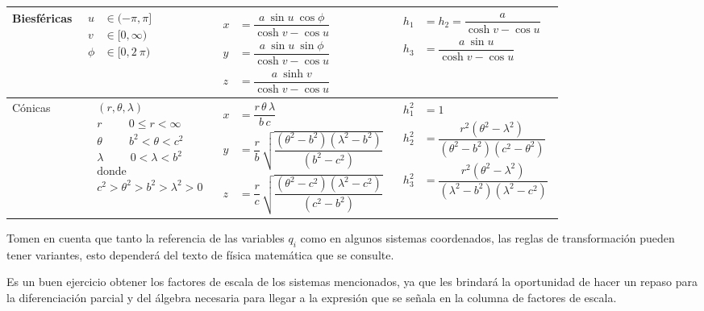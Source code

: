 \documentclass[12pt,landscape]{article}
\numberwithin{equation}{section}
\begin{document}
{\begin{longtable}{| l | p{5cm} | l | p{7.3cm} |}
Biesféricas & $\!\begin{aligned}
u &\in (-\pi, \pi] \\
v &\in [0, \infty) \\
\phi &\in [0, 2\: \pi)
\end{aligned}$ & $\!\begin{aligned}
x &= \dfrac{a \: \sin u \: \cos \phi}{\cosh v - \cos u} \\
y &= \dfrac{a \: \sin u \: \sin \phi}{\cosh v - \cos u} \\
z &= \dfrac{a \: \sinh v}{\cosh v - \cos u}
\end{aligned}$ & $\!\begin{aligned}
h_{1 }&= h_{2} = \dfrac{a}{\cosh v - \cos u} \\
h_{3} &= \dfrac{a \: \sin u}{\cosh v - \cos u}
\end{aligned}$ \\ \hline

Cónicas& $\!\begin{aligned}
&(r, \theta, \lambda) \\
&r \hspace{1cm} 0 \leq r < \infty \\
&\theta \hspace{1cm} b^{2} < \theta < c^{2} \\
&\lambda \hspace{1cm} 0 < \lambda < b^{2} \\
&\mbox{donde }
\\
&c^{2} > \theta^{2} > b^{2} > \lambda^{2} > 0
\end{aligned}$ & $\!\begin{aligned}
x &= \dfrac{r \, \theta \, \lambda}{b \, c} \\
y &= \dfrac{r}{b} \, \sqrt{\dfrac{(\theta^{2} - b^{2})(\lambda^{2} - b^{2})}{(b^{2} - c^{2})}} \\
z &= \dfrac{r}{c} \, \sqrt{\dfrac{(\theta^{2} - c^{2})(\lambda^{2} - c^{2})}{(c^{2} - b^{2})}}
\end{aligned}$ & $\!\begin{aligned}
h_{1}^{2} &= 1\\
h_{2}^{2} &= \dfrac{r^{2} (\theta^{2} - \lambda^{2})}{(\theta^{2} - b^{2})(c^{2} - \theta^{2})} \\
h_{3}^{2} &= \dfrac{r^{2} (\theta^{2} - \lambda^{2})}{(\lambda^{2} - b^{2})(\lambda^{2} - c^{2})}
\end{aligned}$ \\ \hline
\end{longtable}}

Tomen en cuenta que tanto la referencia de las variables $q_{i}$ como en algunos sistemas coordenados, las reglas de transformación pueden tener variantes, esto dependerá del texto de física matemática que se consulte.
\par
Es un buen ejercicio obtener los factores de escala de los sistemas mencionados, ya que les brindará la oportunidad de hacer un repaso para la diferenciación parcial y del álgebra necesaria para llegar a la expresión que se señala en la columna de factores de escala.
\end{document}
